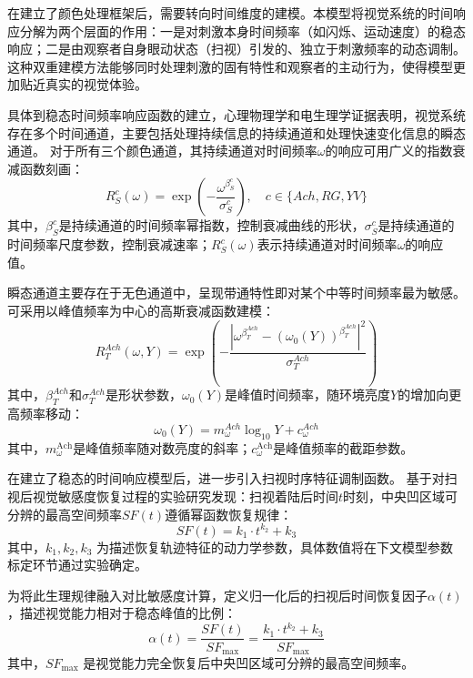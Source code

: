 在建立了颜色处理框架后，需要转向时间维度的建模。本模型将视觉系统的时间响应分解为两个层面的作用：一是对刺激本身时间频率（如闪烁、运动速度）的稳态响应；二是由观察者自身眼动状态（扫视）引发的、独立于刺激频率的动态调制。
这种双重建模方法能够同时处理刺激的固有特性和观察者的主动行为，使得模型更加贴近真实的视觉体验。

具体到稳态时间频率响应函数的建立，心理物理学和电生理学证据表明，视觉系统存在多个时间通道，主要包括处理持续信息的持续通道和处理快速变化信息的瞬态通道\cite{3-4}。
对于所有三个颜色通道，其持续通道对时间频率\(\omega\)的响应可用广义的指数衰减函数刻画\cite{1-2-8}：
\begin{equation}
R_{S}^{c}(\omega) = \exp\left( - \frac{\omega^{\beta_{S}^{c}}}{\sigma_{S}^{c}} \right),\quad c \in \{ Ach,RG,YV\}
\end{equation}
其中，\(\beta_S^c\)是持续通道的时间频率幂指数，控制衰减曲线的形状，\(\sigma_S^c\)是持续通道的时间频率尺度参数，控制衰减速率；\(R_S^c(\omega)\)表示持续通道对时间频率\(\omega\)的响应值。

瞬态通道主要存在于无色通道中，呈现带通特性即对某个中等时间频率最为敏感。可采用以峰值频率为中心的高斯衰减函数建模\cite{1-2-8}：
\begin{equation}
R_T^{Ach}(\omega, Y) = \exp\left(-\frac{\left|\omega^{\beta_T^{Ach}} - (\omega_0(Y))^{\beta_T^{Ach}}\right|^2}{\sigma_T^{Ach}}\right)
\label{eq:transient_channel}
\end{equation}
其中，\(\beta_T^{Ach}\)和\(\sigma_T^{Ach}\)是形状参数，\(\omega_0(Y)\)是峰值时间频率，随环境亮度\(Y\)的增加向更高频率移动：
\begin{equation}
\omega_0(Y) = m_{\omega}^{Ach} \log_{10} Y + c_{\omega}^{Ach}
\label{eq:peak_temporal_freq}
\end{equation}
其中，\(m_{\omega}^{\text{Ach}}\)是峰值频率随对数亮度的斜率；\(c_{\omega}^{\text{Ach}}\)是峰值频率的截距参数。

在建立了稳态的时间响应模型后，进一步引入扫视时序特征调制函数。
基于对扫视后视觉敏感度恢复过程的实验研究发现：扫视着陆后时间$t$时刻，中央凹区域可分辨的最高空间频率$SF(t)$遵循幂函数恢复规律\cite{3-2-6}：
\begin{equation}
SF(t) = k_1 \cdot t^{k_2} + k_3
\label{eq:sf_recovery_raw}
\end{equation}
其中，$k_1, k_2, k_3$ 为描述恢复轨迹特征的动力学参数，具体数值将在下文模型参数标定环节通过实验确定。

为将此生理规律融入对比敏感度计算，定义归一化后的扫视后时间恢复因子\(\alpha(t)\)，描述视觉能力相对于稳态峰值的比例：
\begin{equation}
\alpha(t) = \frac{SF(t)}{SF_{\max}} = \frac{k_1 \cdot t^{k_2} + k_3}{SF_{\max}}
\label{eq:alpha_t}
\end{equation}
其中，\(SF_{\max}\) 是视觉能力完全恢复后中央凹区域可分辨的最高空间频率。

